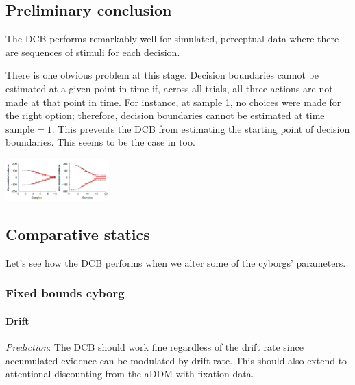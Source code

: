\documentclass[
]{book}
\begin{document}
\hypertarget{preliminary-conclusion}{%
\subsection{Preliminary conclusion}\label{preliminary-conclusion}}

The DCB performs remarkably well for simulated, perceptual data where there are sequences of stimuli for each decision.

There is one obvious problem at this stage. Decision boundaries cannot be estimated at a given point in time if, across all trials, all three actions are not made at that point in time. For instance, at sample 1, no choices were made for the right option; therefore, decision boundaries cannot be estimated at time \(\text{sample}=1\). This prevents the DCB from estimating the starting point of decision boundaries. This seems to be the case in \citep{glickman2022} too.

\includegraphics[width=0.3\textwidth,height=\textheight]{images/dcb-missingEarly.PNG}

\hypertarget{comparative-statics}{%
\subsection{Comparative statics}\label{comparative-statics}}

Let's see how the DCB performs when we alter some of the cyborgs' parameters.

\hypertarget{fixed-bounds-cyborg-3}{%
\subsubsection{Fixed bounds cyborg}\label{fixed-bounds-cyborg-3}}

\hypertarget{drift}{%
\paragraph*{Drift}\label{drift}}

\emph{Prediction}: The DCB should work fine regardless of the drift rate since accumulated evidence can be modulated by drift rate. This should also extend to attentional discounting from the aDDM with fixation data.
\end{document}
